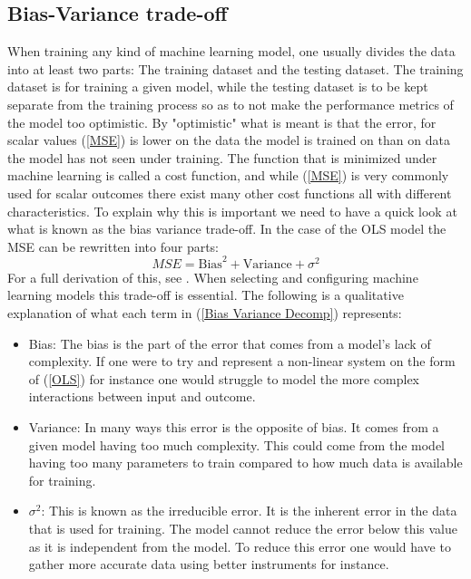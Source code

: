 \subsection{Bias-Variance trade-off}
\label{Bias-Variance trade-off}
When training any kind of machine learning model, one usually divides the data 
into at least two parts: The training dataset and the testing dataset. The training 
dataset is for training a given model, while the testing dataset is to be kept separate 
from the training process so as to not make the performance metrics of the model too optimistic. 
By "optimistic" what is meant is that the error, for scalar values (\ref{MSE}) is 
lower on the data the model is trained on than on data the model has not seen under 
training. The function that is minimized under machine learning is called a 
cost function, and while (\ref{MSE}) is very commonly used for scalar outcomes 
there exist many other cost functions all with different characteristics. \citationneeded
To explain 
why this is important we need to have a quick look at what is known as the 
bias variance trade-off.
In the case of the OLS model the MSE can be rewritten into four parts:
\begin{equation}
    MSE = \text{Bias}^2 + \text{Variance} + \sigma^2
    \label{Bias Variance Decomp}
\end{equation}
For a full derivation of this, see \citet{vijayakumar2007bias}. When selecting and 
configuring machine learning models this trade-off is essential. The following is 
a qualitative explanation of what each term in (\ref{Bias Variance Decomp})
represents:
\begin{itemize}
\item Bias: The bias is the part of the error that comes from a model's lack of complexity.  If one were to try and represent a non-linear system on the form of (\ref{OLS}) for instance one would struggle to model the more complex interactions between input and outcome.
\item Variance: In many ways this error is the opposite of bias. It comes from a given model having too much complexity. This could come from the model having too many parameters to train compared to how much data is available for training. 
\item $\sigma^2$: This is known as the irreducible error. It is the inherent error in the data that is used for training. The model cannot reduce the error below this value as it is independent from the model. To reduce this error one would have to gather more accurate data using better instruments for instance. 
\end{itemize}
